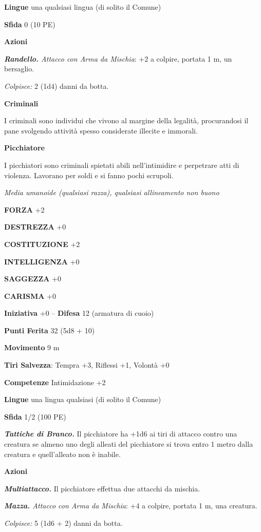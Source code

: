 \begin{multicols}{2}
\textbf{Lingue} una qualsiasi lingua (di solito il Comune)

\textbf{Sfida} 0 (10 PE)

\textbf{Azioni}

\emph{\textbf{Randello.} Attacco con Arma da Mischia}: +2 a colpire, portata 1 m, un bersaglio.

\emph{Colpisce:} 2 (1d4) danni da botta.

\medskip\textbf{Criminali}

I criminali sono individui che vivono al margine della legalità, procurandosi il pane svolgendo attività spesso considerate illecite e immorali.

\medskip\textbf{Picchiatore}

I picchiatori sono criminali spietati abili nell'intimidire e perpetrare atti di violenza. Lavorano per soldi e si fanno pochi scrupoli.

\emph{Media umanoide (qualsiasi razza), qualsiasi allineamento non buono}

\textbf{FORZA} +2

\textbf{DESTREZZA} +0

\textbf{COSTITUZIONE} +2

\textbf{INTELLIGENZA} +0

\textbf{SAGGEZZA} +0

\textbf{CARISMA} +0

\textbf{Iniziativa} +0 -- \textbf{Difesa} 12 (armatura di cuoio)

\textbf{Punti Ferita} 32 (5d8 + 10)

\textbf{Movimento} 9 m

\textbf{Tiri Salvezza}: Tempra +3, Riflessi +1, Volontà +0 

\textbf{Competenze} Intimidazione +2

\textbf{Lingue} una lingua qualsiasi (di solito il Comune)

\textbf{Sfida} 1/2 (100 PE)

\emph{\textbf{Tattiche di Branco.}} Il picchiatore ha +1d6 ai tiri di attacco contro una creatura se almeno uno degli alleati del picchiatore si trova entro 1 metro dalla creatura e quell'alleato non
è inabile.

\textbf{Azioni}

\emph{\textbf{Multiattacco.}} Il picchiatore effettua due attacchi da mischia.

\emph{\textbf{Mazza.} Attacco con Arma da Mischia}: +4 a colpire, portata 1 m, una creatura.

\emph{Colpisce:} 5 (1d6 + 2) danni da botta.


\end{multicols}
